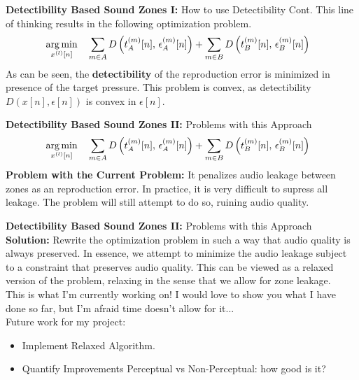 \documentclass[aspectratio=169]{beamer}
\begin{document}
\begin{frame}{\textbf{Detectibility Based Sound Zones I:} How to use Detectibility Cont.} 
    This line of thinking results in the following optimization problem.
    \begin{align*}
        &\argmin{x^{(l)}[n]}{
              \sum_{m\in A} D\left(t_A^{(m)}[n],\,\epsilon_A^{(m)}[n]\right) + 
              \sum_{m\in B} D\left(t_B^{(m)}[n],\,\epsilon_B^{(m)}[n]\right) 
        } 
    \end{align*}
    As can be seen, the \textbf{detectibility} of the reproduction error is minimized in presence of the target pressure.
    This problem is convex, as detectibility $D(x[n], \epsilon[n])$ is convex in $\epsilon[n]$. 
\end{frame}

\begin{frame}{\textbf{Detectibility Based Sound Zones II:} Problems with this Approach} 
    \begin{align*}
        &\argmin{x^{(l)}[n]}{
              \sum_{m\in A} D\left(t_A^{(m)}[n],\,\epsilon_A^{(m)}[n]\right) + 
              \sum_{m\in B} D\left(t_B^{(m)}[n],\,\epsilon_B^{(m)}[n]\right) 
        } 
    \end{align*}
    \textbf{Problem with the Current Problem:} It penalizes audio leakage between zones as an reproduction error.
        In practice, it is very difficult to supress all leakage. 
        The problem will still attempt to do so, ruining audio quality. 
    \begin{figure}
        \centering
        \scalebox{0.5}{}
    \end{figure}
\end{frame}

\begin{frame}{\textbf{Detectibility Based Sound Zones II:} Problems with this Approach} 
    \textbf{Solution:} Rewrite the optimization problem in such a way that audio quality is always preserved.
        In essence, we attempt to minimize the audio leakage subject to a constraint that preserves audio quality.
        This can be viewed as a relaxed version of the problem, relaxing in the sense that we allow for zone leakage.\\
        \vspace{10pt}
        {\color{red} 
            This is what I'm currently working on! 
            I would love to show you what I have done so far, but I'm afraid time doesn't allow for it...
        }\\
        \vspace{10pt}
        Future work for my project:
        \begin{itemize}
            \item Implement Relaxed Algorithm.
            \item Quantify Improvements Perceptual vs Non-Perceptual: how good is it?
        \end{itemize}
\end{frame}
\end{document}
